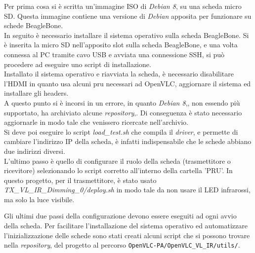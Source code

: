 Per prima cosa si è scritta un'immagine ISO di \textit{Debian 8}, su una scheda micro SD. Questa immagine contiene una versione di \textit{Debian} apposita per funzionare su schede BeagleBone.\\
In seguito è necessario installare il sistema operativo sulla scheda BeagleBone. Si è inserita la micro SD nell'apposito slot sulla scheda BeagleBone, e una volta connessa al PC tramite cavo USB e avviata una connessione SSH, si può procedere ad eseguire uno script di installazione.\\
Installato il sistema operativo e riavviata la scheda, è necessario disabilitare l'HDMI in quanto usa alcuni \gls{pru} necessari ad OpenVLC, aggiornare il sistema ed installare gli headers.\\
A questo punto si è incorsi in un errore, in quanto \textit{Debian 8},, non essendo più supportato, ha archiviato alcune \textit{repository},. Di conseguenza è stato necessario aggiornarle in modo tale che venissero ricercate nell'archivio.\\
Si deve poi eseguire lo script \textit{load\_test.sh} che compila il \textit{driver}, e permette di cambiare l'indirizzo IP della scheda, è infatti indispensabile che le schede abbiano due indirizzi diversi.\\
L'ultimo passo è quello di configurare il ruolo della scheda (trasmettitore o ricevitore) selezionando lo script corretto all'interno della cartella 'PRU'. In questo progetto, per il trasmettitore, è stato usato \textit{TX\_VL\_IR\_Dimming\_0/deploy.sh} in modo tale da non usare il LED infrarossi, ma solo la luce visibile.

Gli ultimi due passi della configurazione devono essere eseguiti ad ogni avvio della scheda. Per facilitare l'installazione del sistema operativo ed automatizzare l'inizializzazione delle schede sono stati creati alcuni script che si possono trovare nella \textit{repository}, del progetto al percorso \texttt{OpenVLC-PA/OpenVLC\_VL\_IR/utils/}.
